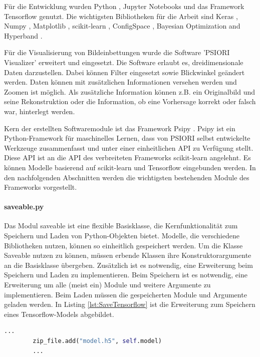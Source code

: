 	Für die Entwicklung wurden Python \cite{PythonSoftwareFoundation.2020}, Jupyter Notebooks \cite{ProjectJupyter.} und das Framework Tensorflow \cite{MartinAbadi.2015}  genutzt. Die wichtigsten Bibliotheken für die Arbeit sind Keras \cite{Chollet.2015} , Numpy \cite{Oliphant.2006} , Matplotlib \cite{Hunter.2007} , scikit-learn \cite{Pedregosa.2011} , ConfigSpace \cite{Lindauer.2019} , Bayesian Optimization and Hyperband \cite{StefanFalkner.2018}. 
	
	Für die Visualisierung von Bildeinbettungen wurde die Software 'PSIORI Visualizer' erweitert und eingesetzt. Die Software erlaubt es, dreidimensionale Daten darzustellen. Dabei können Filter eingesetzt sowie Blickwinkel geändert werden. Daten können mit zusätzlichen Informationen versehen werden und Zoomen ist möglich. Als zusätzliche Information können z.B. ein Originalbild und seine Rekonstruktion oder die Information, ob eine Vorhersage korrekt oder falsch war, hinterlegt werden.
	
	Kern der erstellten Softwaremodule ist das Framework Psipy \cite{PSIORIGmbH.2019}. Psipy ist ein Python-Framework für maschinelles Lernen, dass von PSIORI selbst entwickelte Werkzeuge zusammenfasst und unter einer einheitlichen API zu Verfügung stellt. Diese API ist an die API des verbreiteten Frameworks scikit-learn angelehnt. Es können Modelle basierend auf scikit-learn  und Tensorflow eingebunden werden. In den nachfolgenden Abschnitten werden die wichtigsten bestehenden Module des Frameworks vorgestellt.
	
	 \paragraph{saveable.py} Das Modul saveable ist eine flexible Basisklasse, die Kernfunktionalität zum Speichern und Laden von Python-Objekten bietet. Modelle, die verschiedene Bibliotheken nutzen, können so einheitlich gespeichert werden. Um die Klasse Saveable nutzen zu können, müssen erbende Klassen ihre Konstruktorargumente an die Basisklasse übergeben. Zusätzlich ist es notwendig, eine Erweiterung beim Speichern und Laden zu implementieren. Beim Speichern ist es notwendig, eine Erweiterung um alle (meist ein) Module und weitere Argumente zu implementieren. Beim Laden müssen die gespeicherten Module und Argumente geladen werden. In Listing \ref{lst:SaveTensorflow} ist die Erweiterung zum Speichern eines Tensorflow-Models abgebildet. 
	\begin{lstlisting}[language=python,caption=Erweiterung zum Speichern eines Tensorflow Models, label=lst:SaveTensorflow]
		...
		zip_file.add("model.h5", self.model)
		...
	\end{lstlisting}

